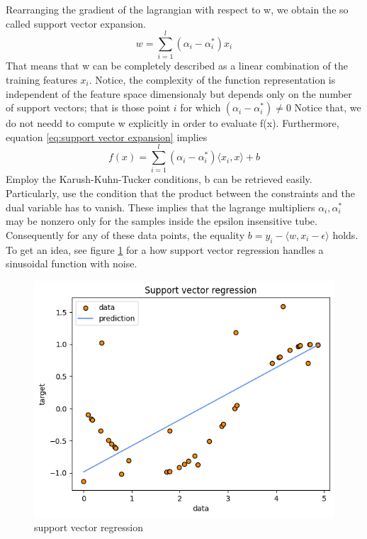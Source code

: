 Rearranging the gradient of the lagrangian with respect to w, we obtain the so called support vector expansion.
\begin{equation}\label{eq:support vector expansion}
    w=\sum\limits_{i=1}^l(\alpha_i-\alpha_i^*)x_i
\end{equation}
That means that w can be completely described as a linear combination of the training features $x_i$.
Notice, the complexity of the function representation is independent of the feature space dimensionaly but depends only on the number of support vectors; that is those point $i$ for which $(\alpha_i-\alpha_i^*)\neq 0$
Notice that, we do not needd to compute w explicitly in order to evaluate f(x).
Furthermore, equation \ref{eq:support vector expansion} implies
\begin{equation}
    f(x)=\sum\limits_{i=1}^l(\alpha_i-\alpha_i^*)\langle x_i, x\rangle +b
\end{equation}
Employ the Karush-Kuhn-Tucker conditions, b can be retrieved easily. Particularly, use the condition that the product between the constraints and the dual variable has to vanish. These implies that the lagrange multipliers $\alpha_i, \alpha_i^*$ may be nonzero only for the samples inside the epsilon insensitive tube. Consequently for any of these data points, the equality $b=y_i-\langle w, x_i-\epsilon\rangle$ holds.
To get an idea, see figure \ref{fig:svr1} for a how support vector regression handles a sinusoidal function with noise.
\\
\begin{figure}
    \includegraphics[width=\textwidth]{images/svr1.png}
    \caption{support vector regression}
    \label{fig:svr1}
\end{figure}

